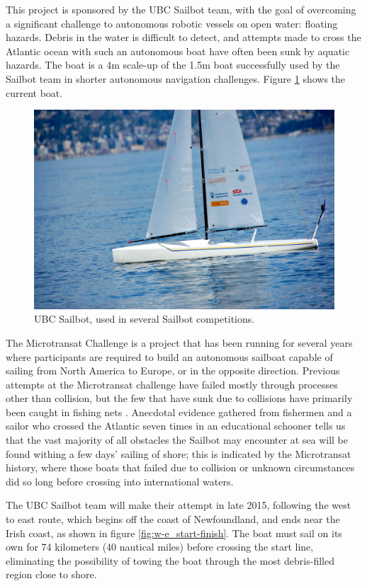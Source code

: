 This project is sponsored by the UBC Sailbot team, with the goal of overcoming a significant challenge to autonomous robotic vessels on open water: floating hazards. Debris in the water is difficult to detect, and attempts made to cross the Atlantic ocean with such an autonomous boat have often been sunk by aquatic hazards. The boat is a 4m scale-up of the 1.5m boat successfully used by the Sailbot team in shorter autonomous navigation challenges. Figure \ref{fig:sailbot} shows the current boat.

\begin{figure}
\includegraphics[width=120mm,natwidth=1203,natheight=627]{"./image/sailbot"}
\caption[UBC Sailbot.]{\label{fig:sailbot}UBC Sailbot, used in several Sailbot competitions. \cite{ubc-sailbot__image}}
\end{figure}

The Microtransat Challenge \cite{transat-history} is a project that has been running for several years where participants are required to build an autonomous sailboat capable of sailing from North America to Europe, or in the opposite direction. Previous attempts at the Microtransat challenge have failed mostly through processes other than collision, but the few that have sunk due to collisions have primarily been caught in fishing nets \cite{transat-history}. Anecdotal evidence gathered from fishermen and a sailor who crossed the Atlantic seven times in an educational schooner tells us that the vast majority of all obstacles the Sailbot may encounter at sea will be found withing a few days' sailing of shore; this is indicated by the Microtransat history, where those boats that failed due to collision or unknown circumstances did so long before crossing into international waters.

The UBC Sailbot team will make their attempt in late 2015, following the west to east route, which begins off the coast of Newfoundland, and ends near the Irish coast, as shown in figure \ref{fig:w-e_start-finish}. The boat must sail on its own for 74 kilometers (40 nautical miles) before crossing the start line, eliminating the possibility of towing the boat through the most debris-filled region close to shore.

